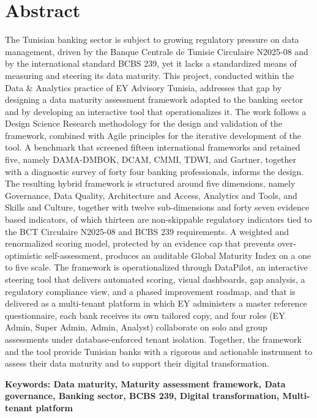 
\section*{\hfill Abstract \hfill}


\vspace{1.4cm}
\large
\noindent
The Tunisian banking sector is subject to growing regulatory pressure on data management, driven by the Banque Centrale de Tunisie Circulaire N\textdegree{}2025-08 and by the international standard BCBS 239, yet it lacks a standardized means of measuring and steering its data maturity. This project, conducted within the Data \& Analytics practice of EY Advisory Tunisia, addresses that gap by designing a data maturity assessment framework adapted to the banking sector and by developing an interactive tool that operationalizes it. The work follows a Design Science Research methodology for the design and validation of the framework, combined with Agile principles for the iterative development of the tool. A benchmark that screened fifteen international frameworks and retained five, namely DAMA-DMBOK, DCAM, CMMI, TDWI, and Gartner, together with a diagnostic survey of forty four banking professionals, informs the design. The resulting hybrid framework is structured around five dimensions, namely Governance, Data Quality, Architecture and Access, Analytics and Tools, and Skills and Culture, together with twelve sub-dimensions and forty seven evidence based indicators, of which thirteen are non-skippable regulatory indicators tied to the BCT Circulaire N\textdegree{}2025-08 and BCBS 239 requirements. A weighted and renormalized scoring model, protected by an evidence cap that prevents over-optimistic self-assessment, produces an auditable Global Maturity Index on a one to five scale. The framework is operationalized through DataPilot, an interactive steering tool that delivers automated scoring, visual dashboards, gap analysis, a regulatory compliance view, and a phased improvement roadmap, and that is delivered as a multi-tenant platform in which EY administers a master reference questionnaire, each bank receives its own tailored copy, and four roles (EY Admin, Super Admin, Admin, Analyst) collaborate on solo and group assessments under database-enforced tenant isolation. Together, the framework and the tool provide Tunisian banks with a rigorous and actionable instrument to assess their data maturity and to support their digital transformation.

\vspace{0.6cm}
\noindent
\textbf{Keywords: Data maturity, Maturity assessment framework, Data governance, Banking sector, BCBS 239, Digital transformation, Multi-tenant platform}
